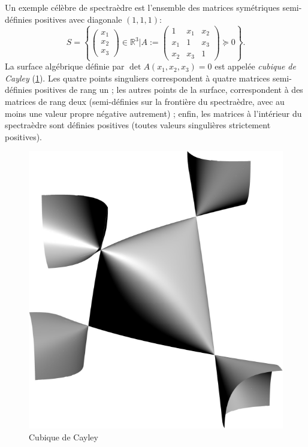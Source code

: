   \begin{ex} Un exemple célèbre de spectraèdre est l'ensemble des matrices symétriques semi-définies positives avec diagonale $(1,1,1)$:
    $$
    S = \left\{
    \begin{pmatrix} x_1 \\ x_2 \\ x_3 \end{pmatrix} \in \mathbb{R}^3 |
    A:=\begin{pmatrix} 1 & x_1 & x_2 \\ x_1 & 1 & x_3 \\ x_2 & x_3 & 1 \end{pmatrix} \succeq 0
    \right\}.
    $$
    La surface algébrique définie par $\det A(x_1,x_2,x_3) = 0$ est appelée {\it cubique de Cayley} (\ref{cayley}).
    Les quatre points singuliers correspondent à quatre matrices semi-définies positives de rang un ; les autres points de la surface, correspondent à des matrices de rang deux (semi-définies sur la frontière du spectraèdre, avec au moins une valeur propre négative autrement) ; enfin, les matrices à l'intérieur du spectraèdre sont définies positives (toutes valeurs singulières strictement positives).
    \begin{figure}[!ht]
      \centering
      \includegraphics[scale=0.3]{figures/cayley.pdf}
      \caption{Cubique de Cayley}
      \label{cayley}
    \end{figure}
  \end{ex}


